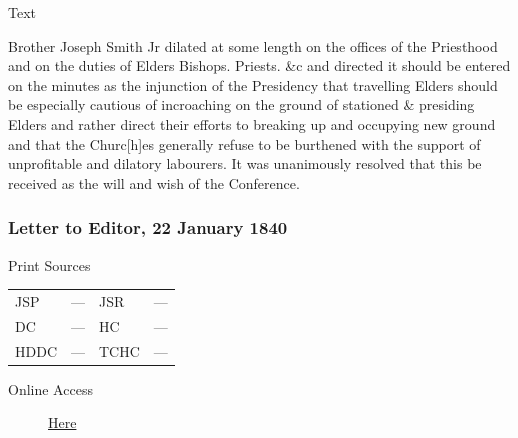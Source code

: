 			
			\begin{description}
				\item[Text]
			\end{description}
			
				Brother Joseph Smith Jr dilated at some length on the offices of the Priesthood and on the duties of Elders Bishops. Priests. \&c and directed it should be entered on the minutes as the injunction of the Presidency that travelling Elders should be especially cautious of incroaching on the ground of stationed \& presiding Elders and rather direct their efforts to breaking up and occupying new ground and that the Churc[h]es generally refuse to be burthened with the support of unprofitable and dilatory labourers. It was unanimously resolved that this be received as the will and wish of the Conference. 
				
		\subsubsection{Letter to Editor, 22 January 1840}
			\label{EMS-1840-JS-22-JAN-1840}
			
			\begin{description}
				\item[Print Sources]
			\end{description}

			\begin{tabular}{p{0.5in}p{1in}p{0.5in}p{1in}}
				JSP	 	& ---		& JSR 		& --- \\
				DC	 	& ---		& HC 		& --- \\
				HDDC 	& ---		& TCHC 		& --- \\
			\end{tabular}
			
			\begin{description}
				\item[Online Access] \href{https://www.josephsmithpapers.org/paper-summary/letter-to-editor-22-january-1840/1}{Here}
			\end{description}
			
